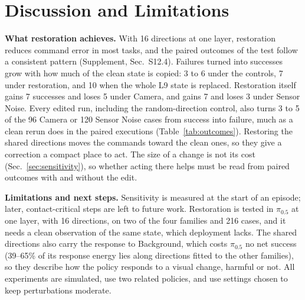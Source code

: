 \section{Discussion and Limitations}
\label{sec:discussion}
\textbf{What restoration achieves.} With 16 directions at one layer, restoration reduces command error in most tasks, and the paired outcomes of the test follow a consistent pattern (Supplement, Sec.~S12.4). Failures turned into successes grow with how much of the clean state is copied: 3 to 6 under the controls, 7 under restoration, and 10 when the whole L9 state is replaced. Restoration itself gains 7 successes and loses 5 under Camera, and gains 7 and loses 3 under Sensor Noise. Every edited run, including the random-direction control, also turns 3 to 5 of the 96 Camera or 120 Sensor Noise cases from success into failure, much as a clean rerun does in the paired executions (Table~\ref{tab:outcomes}). Restoring the shared directions moves the commands toward the clean ones, so they give a correction a compact place to act. The size of a change is not its cost (Sec.~\ref{sec:sensitivity}), so whether acting there helps must be read from paired outcomes with and without the edit.

\textbf{Limitations and next steps.} Sensitivity is measured at the start of an episode; later, contact-critical steps are left to future work. Restoration is tested in $\pi_{0.5}$ at one layer, with 16 directions, on two of the four families and 216 cases, and it needs a clean observation of the same state, which deployment lacks. The shared directions also carry the response to Background, which costs $\pi_{0.5}$ no net success (39--65\% of its response energy lies along directions fitted to the other families), so they describe how the policy responds to a visual change, harmful or not. All experiments are simulated, use two related policies, and use settings chosen to keep perturbations moderate.